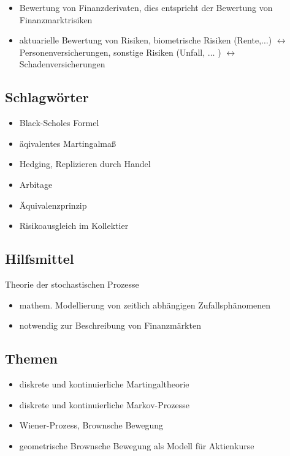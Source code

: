 \begin{itemize}
	\item Bewertung von Finanzderivaten, dies entspricht der Bewertung von Finanzmarktrisiken
	\item aktuarielle Bewertung von Risiken, biometrische Risiken (Rente,$\dots$) $\leftrightarrow$ Personenversicherungen,
	sonstige Risiken (Unfall, $\dots$ ) $\leftrightarrow$ Schadenversicherungen
\end{itemize}

\subsection*{Schlagwörter} %
\label{sub: schlagwörter}

\begin{itemize}
	\item Black-Scholes Formel
	\item äqivalentes Martingalmaß
	\item Hedging, Replizieren durch Handel
	\item Arbitage
	\item Äquivalenzprinzip
	\item Risikoausgleich im Kollektier
\end{itemize}

\subsection*{Hilfsmittel} %
\label{sub:hilfsmittel}

Theorie der stochastischen Prozesse
\begin{itemize}
	\item mathem. Modellierung von zeitlich abhängigen Zufallsphänomenen
	\item notwendig zur Beschreibung von Finanzmärkten
\end{itemize}

\subsection*{Themen} %
\label{sub: themen}

\begin{itemize}
	\item diskrete und kontinuierliche Martingaltheorie
	\item diskrete und kontinuierliche Markov-Prozesse
	\item Wiener-Prozess, Brownsche Bewegung
	\item geometrische Brownsche Bewegung als Modell für Aktienkurse
\end{itemize}

